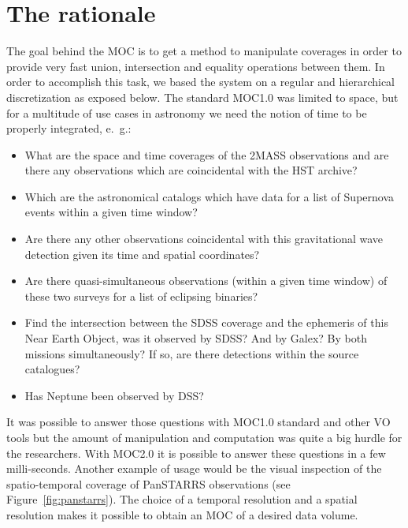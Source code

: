 \documentclass[11pt,a4paper]{ivoa}
\begin{document}
\section{The rationale}
\label{sec:usecases}
The goal behind the MOC is to get a method to manipulate coverages in
order to provide very fast union, intersection and
equality operations between them. In order to accomplish this task, we
based the system on a regular and hierarchical discretization as
exposed below. The standard MOC1.0 was limited to space, but for a
multitude of use cases in astronomy we need the notion of time to be
properly integrated, e.~g.:
\begin{itemize}
\item What are the space and time coverages of the 2MASS observations
  and are there any observations which are coincidental with the HST
  archive?
\item Which are the astronomical catalogs which have data for a list
  of Supernova events within a given time window?
\item Are there any other observations coincidental with this
  gravitational wave detection given its time and spatial coordinates?
\item Are there quasi-simultaneous observations (within a given time
  window) of these two surveys for a list of eclipsing binaries?
\item Find the intersection between the SDSS coverage and the
  ephemeris of this Near Earth Object, was it observed by SDSS? And
  by Galex? By both missions simultaneously? If so, are there
  detections within the source catalogues?
\item Has Neptune been observed by DSS?
\end{itemize}

It was possible to answer those questions with MOC1.0 standard and
other VO tools but the amount of manipulation and computation was
quite a big hurdle for the researchers. With MOC2.0 it is possible
to answer these questions in a few milli-seconds. Another example
of usage would be the visual inspection of the spatio-temporal
coverage of PanSTARRS observations (see Figure~\ref{fig:panstarrs}). 
The choice of a temporal resolution and a spatial resolution makes it
possible to obtain an MOC of a desired data volume. 
\end{document}
